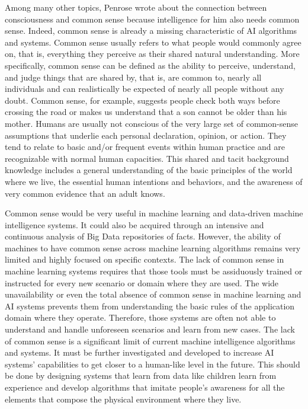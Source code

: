 Among many other topics, Penrose wrote about the connection between consciousness and common sense because intelligence for him also needs common sense. Indeed, common sense is already a missing characteristic of AI algorithms and systems. Common sense usually refers to what people would commonly agree on, that is, everything they perceive as their shared natural understanding. More specifically, common sense can be defined as the ability to perceive, understand, and judge things that are shared by, that is, are common to, nearly all individuals and can realistically be expected of nearly all people without any doubt. Common sense, for example, suggests people check both ways before crossing the road or makes us understand that a son cannot be older than his mother. Humans are usually not conscious of the very large set of common-sense assumptions that underlie each personal declaration, opinion, or action. They tend to relate to basic and/or frequent events within human practice and are recognizable with normal human capacities. This shared and tacit background knowledge includes a general understanding of the basic principles of the world where we live, the essential human intentions and behaviors, and the awareness of very common evidence that an adult knows.

Common sense would be very useful in machine learning and data-driven machine intelligence systems. It could also be acquired through an intensive and continuous analysis of Big Data repositories of facts. However, the ability of machines to have common sense across machine learning algorithms remains very limited and highly focused on specific contexts. The lack of common sense in machine learning systems requires that those tools must be assiduously trained or instructed for every new scenario or domain where they are used. The wide unavailability or even the total absence of common sense in machine learning and AI systems prevents them from understanding the basic rules of the application domain where they operate. Therefore, those systems are often not able to understand and handle unforeseen scenarios and learn from new cases. The lack of common sense is a significant limit of current machine intelligence algorithms and systems. It must be further investigated and developed to increase AI systems' capabilities to get closer to a human-like level in the future. This should be done by designing systems that learn from data like children learn from experience and develop algorithms that imitate people's awareness for all the elements that compose the physical environment where they live.

